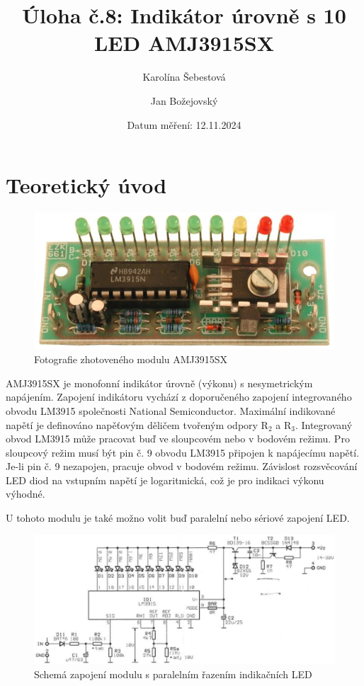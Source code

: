 \documentclass[a4paper, czech]{article}
\title{Úloha č.8: Indikátor úrovně s 10 LED AMJ3915SX}
\author{Karolína Šebestová \and Jan Božejovský}
\date{Datum měření: 12.11.2024}
\begin{document}
\maketitle

\section{Teoretický úvod}

\begin{figure}[H]
    \centering
    \includegraphics{amj3915sx_foto.png}
    \caption{Fotografie zhotoveného modulu AMJ3915SX}
\end{figure}

AMJ3915SX je monofonní indikátor úrovně (výkonu) s nesymetrickým napájením.
Zapojení indikátoru vychází z doporučeného zapojení integrovaného obvodu LM3915 společnosti National Semiconductor.
Maximální indikované napětí je definováno napěťovým děličem tvořeným odpory R$_2$ a R$_3$.
Integrovaný obvod LM3915 může pracovat buď ve sloupcovém nebo v bodovém režimu.
Pro sloupcový režim musí být pin č. 9 obvodu LM3915 připojen k napájecímu napětí.
Je-li pin č. 9 nezapojen, pracuje obvod v bodovém režimu.
Závislost rozsvěcování LED diod na vstupním napětí je logaritmická, což je pro indikaci výkonu výhodné.

U tohoto modulu je také možno volit buď paralelní nebo sériové zapojení LED.

\begin{figure}[H]
    \centering
    \includegraphics[width=\textwidth]{amj3915sx_schema_paralelni.png}
    \caption{Schemá zapojení modulu s paralelním řazením indikačních LED}
\end{figure}
\end{document}

